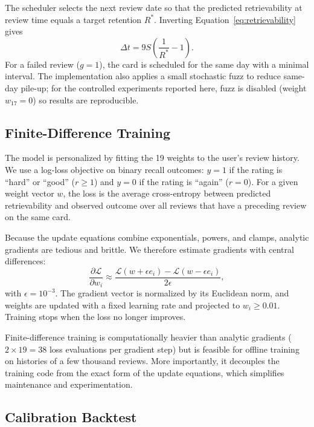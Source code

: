 \documentclass[conference]{IEEEtran}
\begin{document}
The scheduler selects the next review date so that the predicted retrievability at review time equals a target retention $R^*$. Inverting Equation~\eqref{eq:retrievability} gives
\begin{equation}
\Delta t = 9S\left(\frac{1}{R^*} - 1\right).
\end{equation}
For a failed review ($g=1$), the card is scheduled for the same day with a minimal interval. The implementation also applies a small stochastic fuzz to reduce same-day pile-up; for the controlled experiments reported here, fuzz is disabled (weight $w_{17}=0$) so results are reproducible.

\subsection{Finite-Difference Training}

The model is personalized by fitting the 19 weights to the user's review history. We use a log-loss objective on binary recall outcomes: $y=1$ if the rating is ``hard'' or ``good'' ($r \geq 1$) and $y=0$ if the rating is ``again'' ($r=0$). For a given weight vector $w$, the loss is the average cross-entropy between predicted retrievability and observed outcome over all reviews that have a preceding review on the same card.

Because the update equations combine exponentials, powers, and clamps, analytic gradients are tedious and brittle. We therefore estimate gradients with central differences:
\begin{equation}
\frac{\partial \mathcal{L}}{\partial w_i} \approx \frac{\mathcal{L}(w + \epsilon e_i) - \mathcal{L}(w - \epsilon e_i)}{2\epsilon},
\end{equation}
with $\epsilon = 10^{-3}$. The gradient vector is normalized by its Euclidean norm, and weights are updated with a fixed learning rate and projected to $w_i \geq 0.01$. Training stops when the loss no longer improves.

Finite-difference training is computationally heavier than analytic gradients ($2 \times 19 = 38$ loss evaluations per gradient step) but is feasible for offline training on histories of a few thousand reviews. More importantly, it decouples the training code from the exact form of the update equations, which simplifies maintenance and experimentation.

\subsection{Calibration Backtest}
\end{document}
